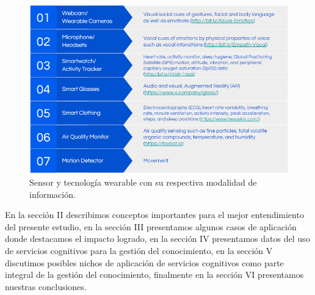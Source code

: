 \begin{figure}[htbp]
\centerline{\includegraphics[width = 0.5 \textwidth]{fig01.png}}
\caption{Sensor y tecnología wearable con su respectiva modalidad de información.}
\label{fig1}
\end{figure}

En la sección II describimos conceptos importantes para el mejor entendimiento del presente estudio, en la sección III presentamos algunos casos de aplicación donde destacamos el impacto logrado, en la sección IV presentamos datos del uso de servicios cognitivos para la gestión del conocimiento, en la sección V discutimos posibles nichos de aplicación de servicios cognitivos como parte integral de la gestión del conocimiento, finalmente en la sección VI presentamos nuestras conclusiones.